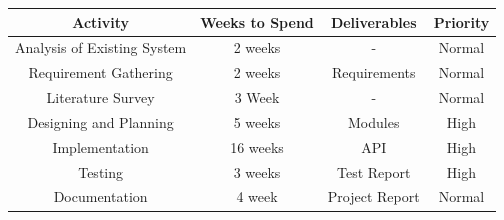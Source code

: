 \documentclass[11pt,letterpaper]{article}
\begin{document}
 {\tabulinesep=2mm
   \begin{tabu} {|c|c|c|c|}
       \hline

	\textbf{Activity} & \textbf{Weeks to Spend} & \textbf{Deliverables} & \textbf{Priority}\\ \hline
	Analysis of Existing System & 2 weeks & - & Normal \\ \hline
	Requirement Gathering & 2 weeks & Requirements & Normal \\ \hline 
	Literature Survey & 3 Week & - & Normal \\ \hline
	Designing and Planning & 5 weeks & Modules & High \\ \hline
	Implementation & 16 weeks & API & High \\ \hline
	Testing & 3 weeks & Test Report & High \\ \hline
	Documentation & 4 week & Project Report & Normal \\ \hline
      
   \end{tabu}
}
\end{document}
